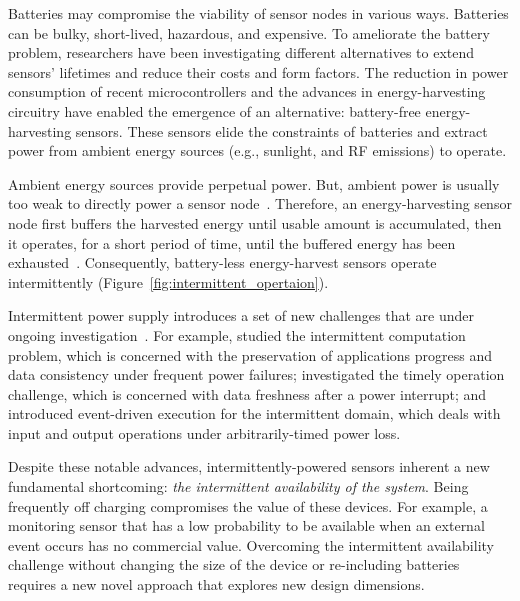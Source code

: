 Batteries may compromise the viability of sensor nodes in various ways. Batteries can be bulky, short-lived, hazardous, and expensive. To ameliorate the battery problem, researchers have been investigating different alternatives to extend sensors’ lifetimes and reduce their costs and form factors.  
The reduction in power consumption of recent microcontrollers and the advances in energy-harvesting circuitry have enabled the emergence of an alternative: battery-free energy-harvesting sensors. 
These sensors elide the constraints of batteries and extract power from ambient energy sources (e.g., sunlight, and RF emissions) to operate. 

Ambient energy sources provide perpetual power. But, ambient power is usually too weak to directly power a sensor node~\cite{liu2013ambient}.  Therefore, an energy-harvesting sensor node first buffers the harvested energy until usable amount is accumulated, then it operates, for a short period of time, until the buffered energy has been exhausted~\cite{lucia2017intermittent}.  Consequently, battery-less energy-harvest sensors operate intermittently (Figure~\ref{fig:intermittent_opertaion}).

Intermittent power supply introduces a set of new challenges that are under ongoing investigation~\cite{lucia2017intermittent}.
For example, \cite{lucia2017intermittent,mementos,dino,colin2016chain,balsamo2015hibernus} studied the intermittent computation problem, which is concerned with the preservation of applications progress and data consistency under frequent power failures; \citet{hester2017timely} investigated the timely operation challenge, which is concerned with data freshness after a power interrupt; 
and \citet{yildirim2018ink} introduced event-driven execution for the intermittent domain, which deals with input and output operations under arbitrarily-timed power loss.

Despite these notable advances, intermittently-powered sensors inherent a new fundamental shortcoming: \textit{the intermittent availability of the system}. Being frequently off charging compromises the value of these devices. For example, a monitoring sensor that has a low probability to be available when an external event occurs has no commercial value. 
Overcoming the intermittent availability challenge without changing the size of the device or re-including batteries requires a new novel approach that explores new design dimensions. 

